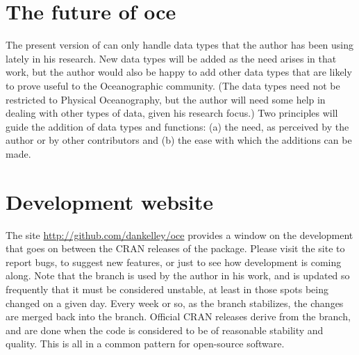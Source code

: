\documentclass{article}
\begin{document}
\section{The future of oce}

The present version of \verb@oce@ can only handle data types that the author has
been using lately in his research. New data types will be added as the need
arises in that work, but the author would also be happy to add other data types
that are likely to prove useful to the Oceanographic community.  (The data types
need not be restricted to Physical Oceanography, but the author will need some
help in dealing with other types of data, given his research focus.)
Two principles will guide the addition of data types and functions:
(a) the need, as perceived by the author or by other contributors and
(b) the ease with which the additions can be made.



\section{Development website}

The site \url{http://github.com/dankelley/oce} provides a window on the
development that goes on between the CRAN releases of the package. Please visit
the site to report bugs, to suggest new features, or just to see how \verb@oce@
development is coming along.  Note that the \verb@development@ branch is used by
the author in his work, and is updated so frequently that it must be considered
unstable, at least in those spots being changed on a given day.  Every week or
so, as the \verb@development@ branch stabilizes, the changes are merged back
into the \verb@master@ branch.  Official CRAN releases derive from the
\verb@master@ branch, and are done when the code is considered to be of
reasonable stability and quality.  This is all in a common pattern for
open-source software.

%
%
%
%
%
\end{document}
